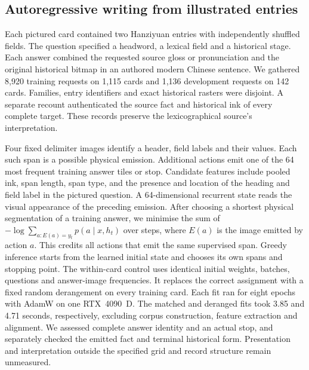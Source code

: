 \subsection*{Autoregressive writing from illustrated entries}
Each pictured card contained two Hanziyuan entries with independently shuffled fields. The question specified a headword, a lexical field and a historical stage. Each answer combined the requested source gloss or pronunciation and the original historical bitmap in an authored modern Chinese sentence. We gathered 8,920 training requests on 1,115 cards and 1,136 development requests on 142 cards. Families, entry identifiers and exact historical rasters were disjoint. A separate recount authenticated the source fact and historical ink of every complete target. These records preserve the lexicographical source's interpretation.

Four fixed delimiter images identify a header, field labels and their values. Each such span is a possible physical emission. Additional actions emit one of the 64 most frequent training answer tiles or stop. Candidate features include pooled ink, span length, span type, and the presence and location of the heading and field label in the pictured question. A 64-dimensional recurrent state reads the visual appearance of the preceding emission. After choosing a shortest physical segmentation of a training answer, we minimise the sum of $-\log\sum_{a:E(a)=y_t}p(a\mid x,h_t)$ over steps, where $E(a)$ is the image emitted by action $a$. This credits all actions that emit the same supervised span. Greedy inference starts from the learned initial state and chooses its own spans and stopping point. The within-card control uses identical initial weights, batches, questions and answer-image frequencies. It replaces the correct assignment with a fixed random derangement on every training card. Each fit ran for eight epochs with AdamW on one RTX~4090~D. The matched and deranged fits took 3.85 and 4.71 seconds, respectively, excluding corpus construction, feature extraction and alignment. We assessed complete answer identity and an actual stop, and separately checked the emitted fact and terminal historical form. Presentation and interpretation outside the specified grid and record structure remain unmeasured.
